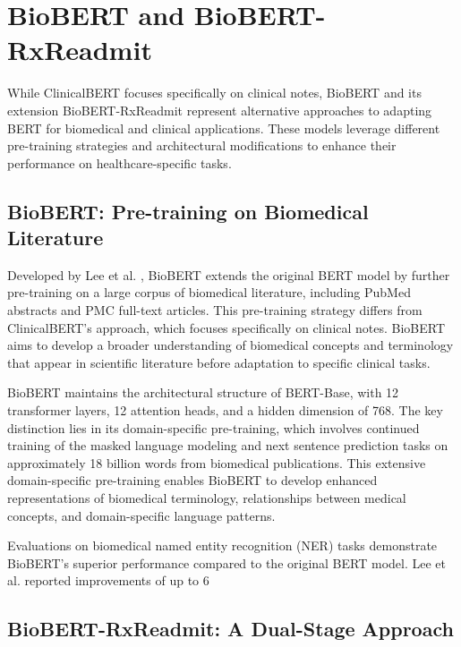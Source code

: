 \documentclass[3p,times,procedia]{elsarticle}
\begin{document}
\section{BioBERT and BioBERT-RxReadmit}\label{biobert}

While ClinicalBERT focuses specifically on clinical notes, BioBERT and its extension BioBERT-RxReadmit represent alternative approaches to adapting BERT for biomedical and clinical applications. These models leverage different pre-training strategies and architectural modifications to enhance their performance on healthcare-specific tasks.

\subsection{BioBERT: Pre-training on Biomedical Literature}

Developed by Lee et al. \cite{Lee2020}, BioBERT extends the original BERT model by further pre-training on a large corpus of biomedical literature, including PubMed abstracts and PMC full-text articles. This pre-training strategy differs from ClinicalBERT's approach, which focuses specifically on clinical notes. BioBERT aims to develop a broader understanding of biomedical concepts and terminology that appear in scientific literature before adaptation to specific clinical tasks.

BioBERT maintains the architectural structure of BERT-Base, with 12 transformer layers, 12 attention heads, and a hidden dimension of 768. The key distinction lies in its domain-specific pre-training, which involves continued training of the masked language modeling and next sentence prediction tasks on approximately 18 billion words from biomedical publications. This extensive domain-specific pre-training enables BioBERT to develop enhanced representations of biomedical terminology, relationships between medical concepts, and domain-specific language patterns.

Evaluations on biomedical named entity recognition (NER) tasks demonstrate BioBERT's superior performance compared to the original BERT model. Lee et al. \cite{Lee2020} reported improvements of up to 6%

\subsection{BioBERT-RxReadmit: A Dual-Stage Approach}
\end{document}
